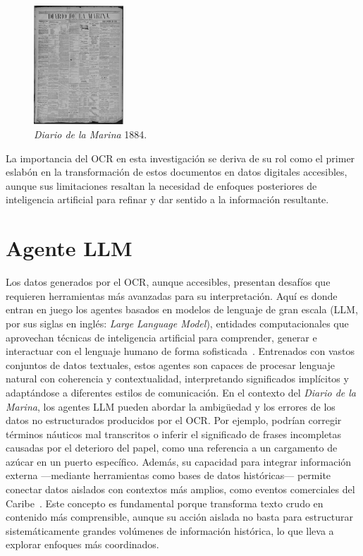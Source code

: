 \begin{figure}[h]
	\centering
	\includegraphics[width=0.3\textwidth]{images/diario}
	\caption{\textit{Diario de la Marina} 1884.}
	\label{fig:Diario de la Marina 1884}
\end{figure}

La importancia del OCR en esta investigación se deriva de su rol como el primer eslabón en la transformación de estos documentos en datos digitales accesibles, aunque sus limitaciones resaltan la necesidad de enfoques posteriores de inteligencia artificial para refinar y dar sentido a la información resultante.

\section{Agente LLM}\label{seq_3}

Los datos generados por el OCR, aunque accesibles, presentan desafíos que requieren herramientas más avanzadas para su interpretación. Aquí es donde entran en juego los agentes basados en modelos de lenguaje de gran escala (LLM, por sus siglas en inglés: \textit{Large Language Model}), entidades computacionales que aprovechan técnicas de inteligencia artificial para comprender, generar e interactuar con el lenguaje humano de forma sofisticada~\cite{guo2024largelanguage}. Entrenados con vastos conjuntos de datos textuales, estos agentes son capaces de procesar lenguaje natural con coherencia y contextualidad, interpretando significados implícitos y adaptándose a diferentes estilos de comunicación.
En el contexto del \textit{Diario de la Marina}, los agentes LLM pueden abordar la ambigüedad y los errores de los datos no estructurados producidos por el OCR. Por ejemplo, podrían corregir términos náuticos mal transcritos o inferir el significado de frases incompletas causadas por el deterioro del papel, como una referencia a un cargamento de azúcar en un puerto específico. Además, su capacidad para integrar información externa —mediante herramientas como bases de datos históricas— permite conectar datos aislados con contextos más amplios, como eventos comerciales del Caribe~\cite{guo2024largelanguage}. Este concepto es fundamental porque transforma texto crudo en contenido más comprensible, aunque su acción aislada no basta para estructurar sistemáticamente grandes volúmenes de información histórica, lo que lleva a explorar enfoques más coordinados.


